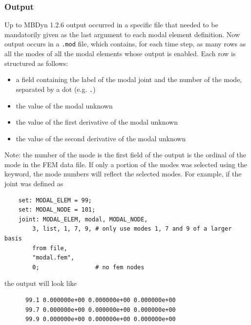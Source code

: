 \subsubsection{Output}
Up to MBDyn 1.2.6 output occurred in a specific file that needed
to be mandatorily given as the last argument to each modal element
definition.
Now output occurs in a \texttt{.mod} file, which contains, for each time step,
as many rows as all the modes of all the modal elements whose output is enabled.
Each row is structured as follows:
\begin{itemize}
\item a field containing the label of the modal joint and the number of the mode,
separated by a dot (e.g. \texttt{.})
\item the value of the modal unknown
\item the value of the first derivative of the modal unknown
\item the value of the second derivative of the modal unknown
\end{itemize}
Note: the number of the mode is the first field of the output
is the ordinal of the mode in the FEM data file.
If only a portion of the modes was selected using the  keyword,
the mode numbers will reflect the selected modes.
For example, if the  joint was defined as
\begin{verbatim}
    set: MODAL_ELEM = 99;
    set: MODAL_NODE = 101;
    joint: MODAL_ELEM, modal, MODAL_NODE,
        3, list, 1, 7, 9, # only use modes 1, 7 and 9 of a larger basis
        from file,
        "modal.fem",
        0;                # no fem nodes
\end{verbatim}
the output will look like
\begin{verbatim}
      99.1 0.000000e+00 0.000000e+00 0.000000e+00
      99.7 0.000000e+00 0.000000e+00 0.000000e+00
      99.9 0.000000e+00 0.000000e+00 0.000000e+00
\end{verbatim}


